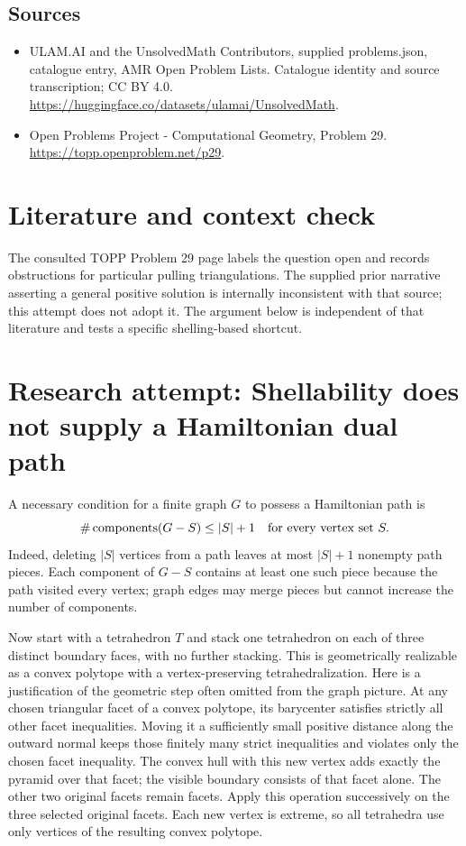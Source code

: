 \documentclass[11pt,a4paper]{article}
\begin{document}
\subsection{Sources}
\begin{itemize}
\item[S1] ULAM.AI and the UnsolvedMath Contributors, supplied problems.json, catalogue entry, AMR Open Problem Lists. Catalogue identity and source transcription; CC BY 4.0.
\url{https://huggingface.co/datasets/ulamai/UnsolvedMath}.
\item[S2] Open Problems Project - Computational Geometry, Problem 29. 
\url{https://topp.openproblem.net/p29}.
\end{itemize}

\section{Literature and context check}
The consulted TOPP Problem 29 page labels the question open and records
obstructions for particular pulling triangulations. The supplied prior narrative
asserting a general positive solution is internally inconsistent with that source;
this attempt does not adopt it. The argument below is independent of that
literature and tests a specific shelling-based shortcut.
\section{Research attempt: Shellability does not supply a Hamiltonian dual path}
A necessary condition for a finite graph $G$ to possess a Hamiltonian path is
\[
 \#\operatorname{components}(G-S)\le |S|+1
 \quad\hbox{for every vertex set }S.
\]
Indeed, deleting $|S|$ vertices from a path leaves at most $|S|+1$ nonempty
path pieces. Each component of $G-S$ contains at least one such piece because
the path visited every vertex; graph edges may merge pieces but cannot increase
the number of components.

Now start with a tetrahedron $T$ and stack one tetrahedron on each of three
distinct boundary faces, with no further stacking. This is geometrically
realizable as a convex polytope with a vertex-preserving tetrahedralization.
Here is a justification of the geometric step often omitted from the graph
picture. At any chosen triangular facet of a convex polytope, its barycenter
satisfies strictly all other facet inequalities. Moving it a sufficiently small
positive distance along the outward normal keeps those finitely many strict
inequalities and violates only the chosen facet inequality. The convex hull
with this new vertex adds exactly the pyramid over that facet; the visible
boundary consists of that facet alone. The other two original facets remain
facets. Apply this operation successively on the three selected original facets.
Each new vertex is extreme, so all tetrahedra use only vertices of the resulting
convex polytope.
\end{document}
